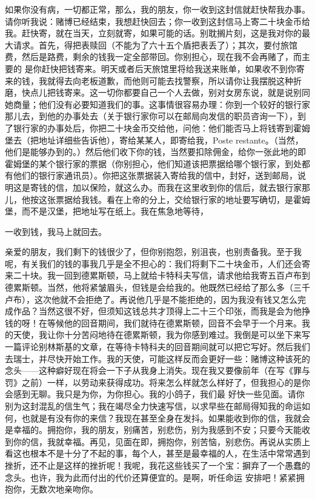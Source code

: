 \documentclass{article}
\begin{document}
如果你没有病，一切都正常，那么，我的朋友，你一收到这封信就赶快帮我办事。请你听我说：赌博已经结束，我想赶快回去；你一收到这封信马上寄二十块金币给我。赶快寄，就在当天，立刻就寄，如果可能的话。别耽搁片刻，这是我对你的最大请求。首先，得把表赎回（不能为了六十五个盾把表丢了）；其次，要付旅馆费，然后是路费，剩余的钱我一定全部带回。你别担心，现在我不会再赌了，而主要的
\newpage
是你赶快把钱寄来。明天或者后天旅馆里将给我送来账单，如果收不到你寄来的钱，我就得去向老板道歉，而他则可能去找警察，所以请你让我摆脱这种折磨，快点儿把钱寄来。这一切你都要自己一个人去做，别对女房东说，就是说别同她商量；他们没有必要知道我们的事。这事情很容易办理：你到一个较好的银行家那儿去，到他的办事处去（关于银行家你可以在邮局向发信的职员咨询一下），到了银行家的办事处后，你把二十块金币交给他，问他：他们能否马上将钱寄到霍姆堡去（把地址详细些告诉他），寄给某某人，即寄给我，Poste restante。（当然，他们是能够办到的。）然后他们收下你的钱，当然要扣除佣金，给你一张此地的即霍姆堡的某个银行家的票据（你别担心，他们知道该把票据给哪个银行家，到处都有他们的银行家通讯员）。你把这张票据装入寄给我的信中，封好，送到邮局，说明这是寄钱的信，加以保险，就这么办。而我在这里收到你的信后，就去银行家那儿，他按这张票据给我钱。看在上帝的分上，交给银行家的地址要写确切，是霍姆堡，而不是汉堡，把地址写在纸上。我在焦急地等待，

\newpage
一收到钱，我马上就回去。 

亲爱的朋友，我们剩下的钱很少了，但你别抱怨，别沮丧，也别责备我。至于我呢，有关我们的钱的事我几乎是全不担心的：我们将剩下二十块金币，人们还会寄来二十块。我一回到德累斯顿，马上就给卡特科夫写信，请求他给我寄五百卢布到德累斯顿。当然，他将紧皱眉头，但钱是会给我的。他既然已经给了那么多（三千卢布），这次他就不会拒绝了。再说他几乎是不能拒绝的，因为我没有钱又怎么完成作品？当然这很不好，但须知这钱总共才顶得上二十三个印张，而我是会为他挣钱的呀！在等候他的回音期间，我们就待在德累斯顿，回音不会早于一个月来。我的天使，我让你十分苦闷地待在德累斯顿，我为你感到难过。我倒是可以坐下来写一篇评论别林斯基的文章，在等待卡特科夫的回音期间就可以把它写好。然后我们去瑞士，并尽快开始工作。我的天使，可能这样反而会更好一些：赌博这种该死的念头——这种癖好现在将会一下子从我身上消失。现在我又要像前年（在写《罪与罚》之前）一样，以劳动来获得成功。将来怎么样就怎么样好了，但我担心的是你会感到无聊。我只是为你，为你担心。我的小鸽子，我们最
\newpage
好快一些见面。请你别为这封混乱的信生气；我在竭尽全力快速写信，以求早些在邮局得知我的命运如何，也就是有没有你的来信？我现在甚至全身在发抖。如果能收到你的信，我就会是幸福的。拥抱你，我的朋友，别痛苦，别悲伤，别为我感到不安；只要今天能收到你的信，我就幸福。再见，见面在即，拥抱你，别苦恼，别悲伤。再说从实质上看这也根本不是十分了不起的事，每个人，甚至是最幸福的人，在生活中常常遇到挫折，还不止是这样的挫折呢！我呢，我花这些钱买了一个宝：摒弃了一个愚蠢的念头。也许，我为此而付出的代价还算便宜的。是啊，听任命运
安排吧！紧紧拥抱你，无数次地亲吻你。 
\end{document}
